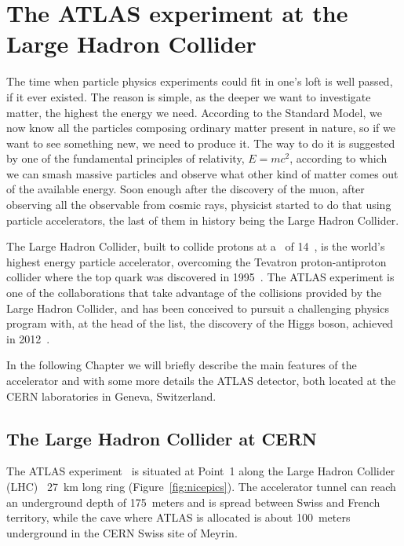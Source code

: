 \clearpage{\pagestyle{empty}\cleardoublepage}

\chapter{The ATLAS experiment at the Large Hadron Collider}\label{chap:atlas}

The time when particle physics experiments could fit in one's
loft is well passed, if it ever existed. The reason is simple,
as the deeper we want to investigate matter, the highest the energy
we need. According to the Standard Model, we now know all the
particles composing ordinary matter present in nature, so if we
want to see something new, we need to produce it. The way to
do it is suggested by one of the fundamental principles of relativity,
$E=mc^2$, according to which we can smash massive particles
and observe what other kind of matter comes out of the
available energy.
Soon enough after the discovery of the muon, after observing all
the observable from cosmic rays, physicist
started to do that using particle accelerators, the last of
them in history being the Large Hadron Collider.

The Large Hadron Collider, built to collide protons at a \cme\ of 14~\tev, 
is the world's highest energy particle accelerator, overcoming the Tevatron
proton-antiproton collider where the top quark was discovered
in 1995~\cite{PhysRevLett.74.2422,PhysRevLett.74.2626}.
The ATLAS experiment is one of the collaborations that take advantage
of the collisions provided by the Large Hadron Collider,
and has been conceived to pursuit a challenging physics program with,
at the head of the list, the discovery of the Higgs boson, achieved
in 2012~\cite{2012gk}.

In the following Chapter we will briefly describe the main features of 
the accelerator and with some more details the ATLAS detector, 
both located at the CERN laboratories in Geneva,
Switzerland.


\section{The Large Hadron Collider at CERN}\label{sec:lhc}

The ATLAS experiment~\cite{Aad:2008zzm} is situated at Point~1 along the Large Hadron Collider 
(LHC)~\cite{lhc} 27~km long ring (Figure~\ref{fig:nicepics}).
The accelerator
tunnel can reach an underground depth of 175~meters and is spread between Swiss
and French territory, while the cave where ATLAS is allocated is about 100~meters 
underground in the CERN Swiss site of Meyrin.


